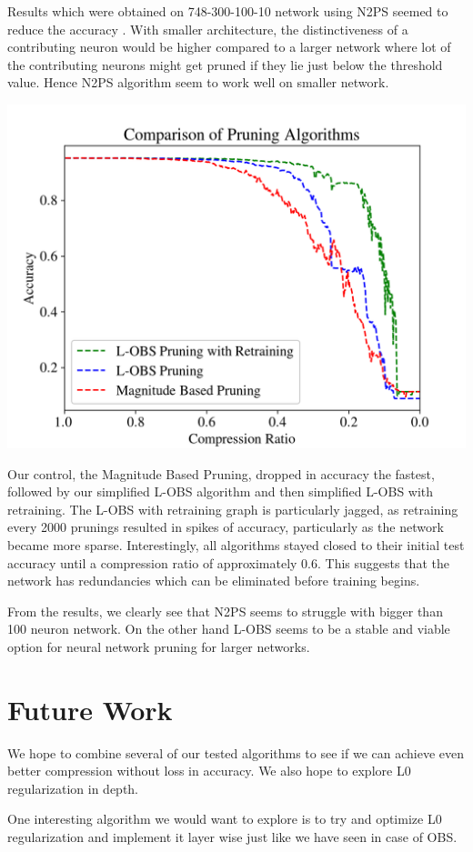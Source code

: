 \documentclass{article}
\begin{document}
 Results which were obtained on 748-300-100-10 network using N2PS seemed to reduce the accuracy .
With smaller architecture, the distinctiveness of a contributing neuron would be higher compared to a larger network where lot of the contributing neurons might get pruned if they lie just below the threshold value. Hence N2PS algorithm seem to work well on smaller network. 

\includegraphics[scale=0.65]{Comparison}

Our control, the Magnitude Based Pruning, dropped in accuracy the fastest, followed by our simplified L-OBS algorithm and then simplified L-OBS with retraining. The L-OBS with retraining graph is particularly jagged, as retraining every 2000 prunings resulted in spikes of accuracy, particularly as the network became more sparse. Interestingly, all algorithms stayed closed to their initial test accuracy until a compression ratio of approximately 0.6. This suggests that the network has redundancies which can be eliminated before training begins.

From the results, we clearly see that N2PS seems to struggle with bigger than 100 neuron network. On the other hand L-OBS seems to be a stable and viable option for neural network pruning for larger networks. 

\section{Future Work}
\label{Future Work}

We hope to combine several of our tested algorithms to see if we can achieve even better compression without loss in accuracy. We also hope to explore L0 regularization in depth. 

One interesting algorithm we would want to explore is to try and optimize L0 regularization and implement it layer wise just like we have seen in case of OBS.


\newpage



\end{document}

